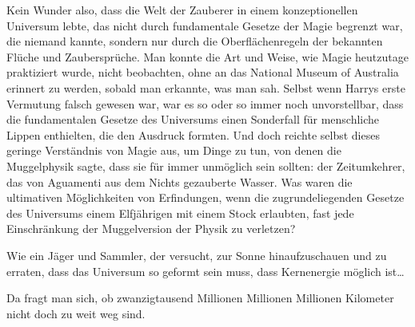 Kein Wunder also, dass die Welt der Zauberer in einem konzeptionellen Universum lebte, das nicht durch fundamentale Gesetze der Magie begrenzt war, die niemand kannte, sondern nur durch die Oberflächenregeln der bekannten Flüche und Zaubersprüche. Man konnte die Art und Weise, wie Magie heutzutage praktiziert wurde, nicht beobachten, ohne an das National Museum of Australia erinnert zu werden, sobald man erkannte, was man sah. Selbst wenn Harrys erste Vermutung falsch gewesen war, war es so oder so immer noch unvorstellbar, dass die fundamentalen Gesetze des Universums einen Sonderfall für menschliche Lippen enthielten, die den Ausdruck  formten. Und doch reichte selbst dieses geringe Verständnis von Magie aus, um Dinge zu tun, von denen die Muggelphysik sagte, dass sie für immer unmöglich sein sollten: der Zeitumkehrer, das von Aguamenti aus dem Nichts gezauberte Wasser. Was waren die ultimativen Möglichkeiten von Erfindungen, wenn die zugrundeliegenden Gesetze des Universums einem Elfjährigen mit einem Stock erlaubten, fast jede Einschränkung der Muggelversion der Physik zu verletzen?

Wie ein Jäger und Sammler, der versucht, zur Sonne hinaufzuschauen und zu erraten, dass das Universum so geformt sein muss, dass Kernenergie möglich ist…

Da fragt man sich, ob zwanzigtausend Millionen Millionen Millionen Kilometer nicht doch zu weit weg sind.

